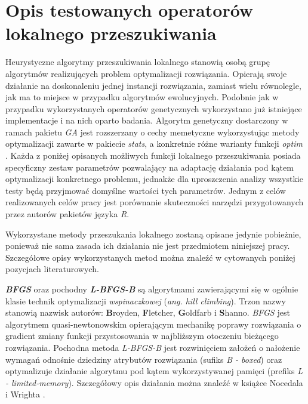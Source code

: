 \section{Opis testowanych operatorów lokalnego przeszukiwania}
\label{sec:operatory_lokalnego_przeszukiwania}
\par
Heurystyczne algorytmy przeszukiwania lokalnego stanowią osobą grupę algorytmów realizujących problem optymalizacji rozwiązania. Opierają swoje działanie na doskonaleniu jednej instancji rozwiązania, zamiast wielu równolegle, jak ma to miejsce w przypadku algorytmów ewolucyjnych. Podobnie jak w przypadku wykorzystanych operatorów genetycznych wykorzystano już istniejące implementacje i na nich oparto badania. Algorytm genetyczny dostarczony w ramach pakietu \emph{GA} \cite{gaPackage} jest rozszerzany o cechy memetyczne wykorzystując metody optymalizacji zawarte w pakiecie \emph{stats}, a konkretnie różne warianty funkcji \emph{optim} \cite{statsPackage}. Każda z poniżej opisanych możliwych funkcji lokalnego przeszukiwania posiada specyficzny zestaw parametrów pozwalający na adaptację działania pod kątem optymalizacji konkretnego problemu, jednakże dla uproszczenia analizy wszystkie testy będą przyjmować domyślne wartości tych parametrów. Jednym z celów realizowanych celów pracy jest porównanie skuteczności narzędzi przygotowanych przez autorów pakietów języka \emph{R}.
\par
Wykorzystane metody przeszukania lokalnego zostaną opisane jedynie pobieżnie, ponieważ nie sama zasada ich działania nie jest przedmiotem niniejszej pracy. Szczegółowe opisy wykorzystanych metod można znaleźć w cytowanych poniżej pozycjach literaturowych.
\par
\textbf{\emph{BFGS}} oraz pochodny \textbf{\emph{L-BFGS-B}} są algorytmami zawierającymi się w ogólnie klasie technik optymalizacji \emph{wspinaczkowej} (\emph{ang. hill climbing}). Trzon nazwy stanowią nazwisk autorów:  \textbf{B}royden, \textbf{F}letcher, \textbf{G}oldfarb i \textbf{S}hanno. \emph{BFGS} jest algorytmem quasi-newtonowskim opierającym mechanikę poprawy rozwiązania o gradient zmiany funkcji przystosowania w najbliższym otoczeniu bieżącego rozwiązania. Pochodna metoda \emph{L-BFGS-B} jest rozwinięciem założeń o nałożenie wymagań odnośnie dziedziny atrybutów rozwiązania (sufiks \emph{B - boxed}) oraz optymalizuje działanie algorytmu pod kątem wykorzystywanej pamięci (prefiks \emph{L - limited-memory}). Szczegółowy opis działania można znaleźć w książce Nocedala i Wrighta \cite{nocedal2006numerical}. 

